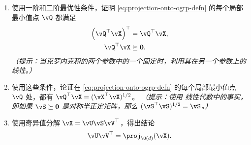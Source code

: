 \documentclass[../../book-main_zh.tex]{subfiles}
\begin{document}
\begin{exercise}
\begin{enumerate}
            \begin{enumerate}
                \item 使用一阶和二阶最优性条件，证明
                    \eqref{eq:projection-onto-ogrp-defn} 的每个局部最小值点 $\vQ$ 都满足
                    \begin{align*}
                        \left( \vQ^\top \vX \right)^\top &= \vQ^\top \vX, \\
                        \vQ^\top \vX &\succeq \mathbf{0}.
                    \end{align*}
                    \textit{（提示：当克罗内克积的两个参数中的一个固定时，利用其在另一个参数上的线性。）}
                \item 使用这些条件，论证在 \eqref{eq:projection-onto-ogrp-defn}
                    的每个局部最小值点 $\vQ$ 处，都有 $\vQ^\top \vX = (\vX^\top \vX)^{1/2}$。
                    \textit{（提示：使用 %
                        线性代数中的事实，即如果 $\vS \succeq
                    \mathbf{0}$ 是对称半正定矩阵，那么 $(\vS^\top\vS)^{1/2} = \vS$。）}
                \item 使用奇异值分解 $\vX =
                    \vU \vS \vV^\top$，得出结论
                    \begin{equation*}
                        \vU \vV^\top
                        =
                        \proj_{\O(d)}(\vX).
                    \end{equation*}
            \end{enumerate}
    \end{enumerate}
\end{exercise}
\end{document}
